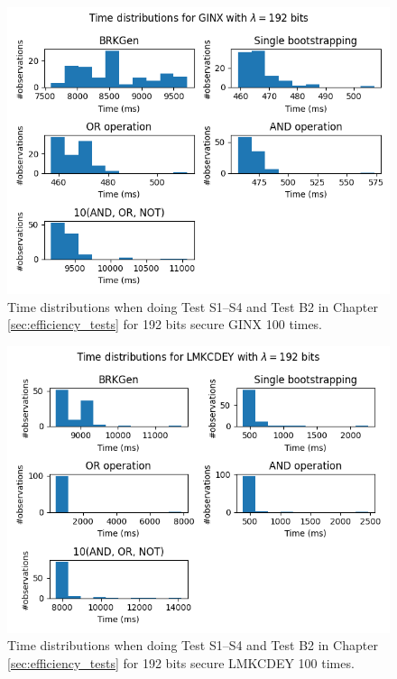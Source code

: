 \begin{figure}[ht]
    \centering
    \includegraphics[width=\textwidth]{data/figures/GINX_STD192_distributions.png}
    \caption{Time distributions when doing Test S1--S4 and Test B2 in Chapter \ref{sec:efficiency_tests} for 192 bits secure GINX 100 times.}
    \label{fig:distr_ginx192}
\end{figure}

\begin{figure}[ht]
    \centering
    \includegraphics[width=\textwidth]{data/figures/LMKCDEY_STD192_distributions.png}
    \caption{Time distributions when doing Test S1--S4 and Test B2 in Chapter \ref{sec:efficiency_tests} for 192 bits secure LMKCDEY 100 times.}
    \label{fig:distr_lmkcdey192}
\end{figure}

